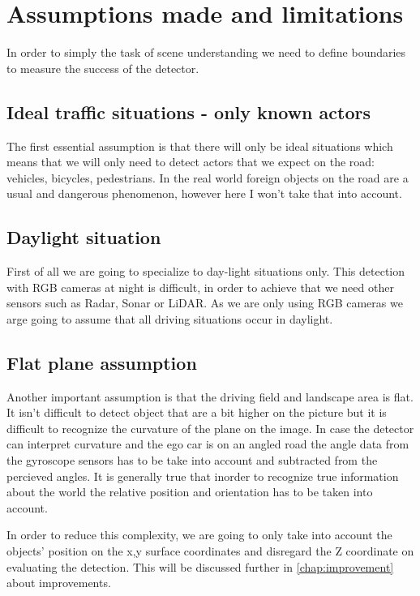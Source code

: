 \chapter{Assumptions made and limitations}
\label{chap:assumptions}

In order to simply the task of scene understanding we need
to define boundaries to measure the success of the detector. 

\section{Ideal traffic situations - only known actors}
The first essential assumption is that there will only be ideal situations which
means that we will only need to detect actors that we expect on the road:
vehicles, bicycles, pedestrians. In the real world foreign objects on the road
are a usual and dangerous phenomenon, however here I won't take that into
account.

\section{Daylight situation}

First of all we are going to specialize to day-light situations only. This
detection with RGB cameras at night is difficult, in order to achieve that we
need other sensors such as Radar, Sonar or LiDAR. As we are only using RGB
cameras we arge going to assume that all driving situations occur in daylight.

\section{Flat plane assumption}
Another important assumption is that the driving field and landscape area is
flat. It isn't difficult to detect object that are a bit higher on the picture
but it is difficult to recognize the curvature of the plane on the image. In
case the detector can interpret curvature and the ego car is on an angled road
the angle data from the gyroscope sensors has to be take into account and
subtracted from the percieved angles. It is generally true that inorder to
recognize true information about the world the relative position and orientation
has to be taken into account.

In order to reduce this complexity, we are going to only take into account the
objects' position on the x,y surface coordinates and disregard the Z coordinate
on evaluating the detection. This will be discussed further in
\autoref{chap:improvement} about improvements.


